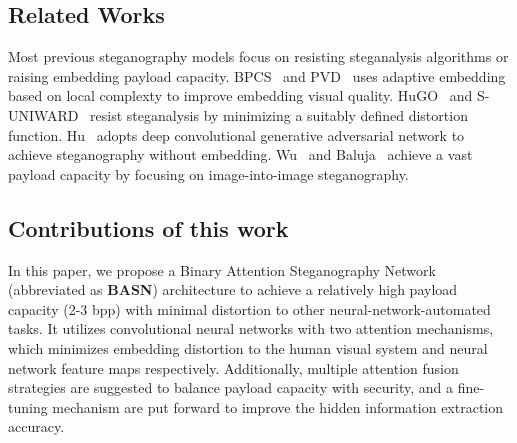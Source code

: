 \subsection{Related Works}

Most previous steganography models focus on resisting steganalysis algorithms or raising embedding payload capacity. BPCS~\cite{BPCS2002,BPCS2015} and PVD~\cite{PVD,PVD_LSB,PVD_Mod} uses adaptive embedding based on local complexty to improve embedding visual quality. HuGO~\cite{HUGO} and S-UNIWARD~\cite{S_UNIWARD} resist steganalysis by minimizing a suitably defined distortion function. Hu~\cite{GANStego} adopts deep convolutional generative adversarial network to achieve steganography without embedding. Wu~\cite{StegNet} and Baluja~\cite{HIPS} achieve a vast payload capacity by focusing on image-into-image steganography.

\subsection{Contributions of this work}

In this paper, we propose a Binary Attention Steganography Network (abbreviated as \textbf{BASN}) architecture to achieve a relatively high payload capacity (2-3 bpp) with minimal distortion to other neural-network-automated tasks. It utilizes convolutional neural networks with two attention mechanisms, which minimizes embedding distortion to the human visual system and neural network feature maps respectively. Additionally, multiple attention fusion strategies are suggested to balance payload capacity with security, and a fine-tuning mechanism are put forward to improve the hidden information extraction accuracy.
